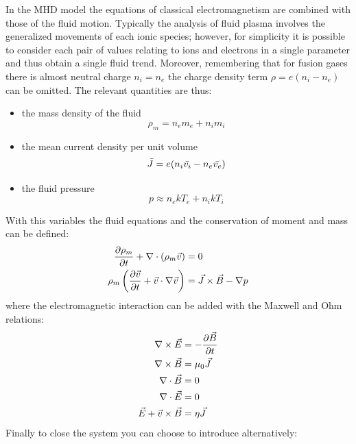 In the MHD model the equations of classical electromagnetism are combined with those of the fluid motion. Typically the analysis of fluid plasma involves the generalized movements of each ionic species; however, for simplicity it is possible to consider each pair of values relating to ions and electrons in a single parameter and thus obtain a single fluid trend. Moreover, remembering that for fusion gases there is almost neutral charge $n_i = n_e$ the charge density term $\rho = e(n_i - n_e)$ can be omitted. The relevant quantities are thus:
\begin{itemize}
    \item the mass density of the fluid
    \begin{equation}
        \rho_m = n_e m_e + n_i m_i
    \end{equation}
    \item the mean current density per unit volume
    \begin{equation}
        \bar{J} = e(n_i \bar{v_i} - n_e \bar{v_e})
    \end{equation}
    \item the fluid pressure
    \begin{equation}
        p \approx n_e k T_e + n_i k T_i
    \end{equation}
\end{itemize}
With this variables the fluid equations and the conservation of moment and mass can be defined:
\begin{align}
    \pdv{\rho_m}{t} + \nabla \cdot (\rho_m \Vec{v}) &= 0 \\
    \rho_m \left( \pdv{\Vec{v}}{t} + \Vec{v} \cdot \nabla \Vec{v} \right) &= \Vec{J} \times \Vec{B} - \nabla p
    \label{eq:mhd_momentum} 
 \end{align}
where the electromagnetic interaction can be added with the Maxwell and Ohm relations:
\begin{align}
    \nabla \times \Vec{E} &= - \pdv{\Vec{B}}{t} \label{eq:faraday} \\
    \nabla \times \Vec{B} &= \mu_0 \Vec{J} \label{eq:ampere} \\
    \nabla \cdot \Vec{B}  &= 0 \\
    \nabla \cdot \Vec{E}  &= 0 \\
    \Vec{E} + \Vec{v} \times \Vec{B} &= \eta \Vec{J} \label{eq:ohm}
\end{align}
Finally to close the system you can choose to introduce alternatively:
